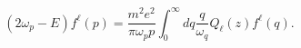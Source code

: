 \begin{equation}
\left( 2\omega _{p}-E\right) f^{\ell }(p)=\frac{m^{2}e^{2}}{\pi \omega
_{p} p }\int_{0}^{\infty }dq\frac{q}{\omega _{q}}%
Q_{\ell }(z)f^{\ell }(q).
\end{equation}

